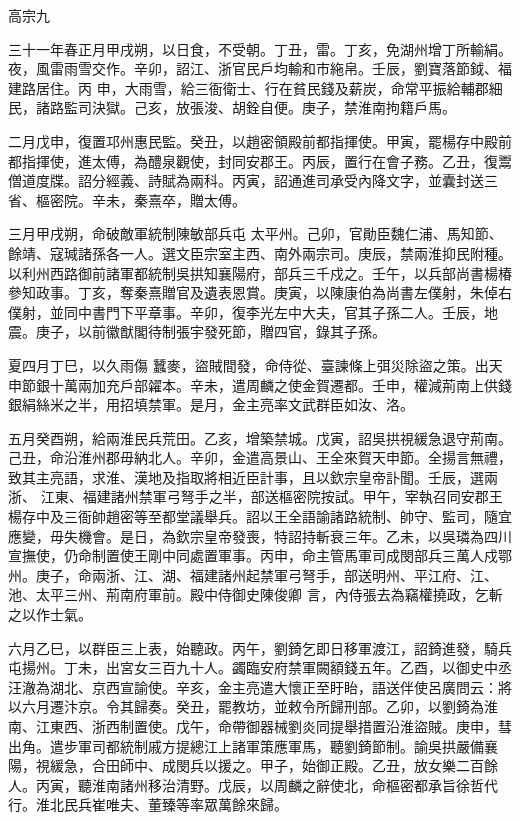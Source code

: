 
\begin{pinyinscope}

 高宗九



 三十一年春正月甲戌朔，以日食，不受朝。丁丑，雷。丁亥，免湖州增丁所輸絹。夜，風雷雨雪交作。辛卯，詔江、浙官民戶均輸和市絁帛。壬辰，劉寶落節鉞、福建路居住。丙
 申，大雨雪，給三衙衛士、行在貧民錢及薪炭，命常平振給輔郡細民，諸路監司決獄。己亥，放張浚、胡銓自便。庚子，禁淮南拘籍戶馬。



 二月戊申，復置邛州惠民監。癸丑，以趙密領殿前都指揮使。甲寅，罷楊存中殿前都指揮使，進太傅，為醴泉觀使，封同安郡王。丙辰，置行在會子務。乙丑，復鬻僧道度牒。詔分經義、詩賦為兩科。丙寅，詔通進司承受內降文字，並囊封送三省、樞密院。辛未，秦熹卒，贈太傅。



 三月甲戌朔，命破敵軍統制陳敏部兵屯
 太平州。己卯，官勛臣魏仁浦、馬知節、餘靖、寇瑊諸孫各一人。選文臣宗室主西、南外兩宗司。庚辰，禁兩淮抑民附種。以利州西路御前諸軍都統制吳拱知襄陽府，部兵三千戍之。壬午，以兵部尚書楊椿參知政事。丁亥，奪秦熹贈官及遺表恩賞。庚寅，以陳康伯為尚書左僕射，朱倬右僕射，並同中書門下平章事。辛卯，復李光左中大夫，官其子孫二人。壬辰，地震。庚子，以前徽猷閣待制張宇發死節，贈四官，錄其子孫。



 夏四月丁巳，以久雨傷
 蠶麥，盜賊間發，命侍從、臺諫條上弭災除盜之策。出天申節銀十萬兩加充戶部糴本。辛未，遣周麟之使金賀遷都。壬申，權減荊南上供錢銀絹絲米之半，用招填禁軍。是月，金主亮率文武群臣如汝、洛。



 五月癸酉朔，給兩淮民兵荒田。乙亥，增築禁城。戊寅，詔吳拱視緩急退守荊南。己丑，命沿淮州郡毋納北人。辛卯，金遣高景山、王全來賀天申節。全揚言無禮，致其主亮語，求淮、漢地及指取將相近臣計事，且以欽宗皇帝訃聞。壬辰，選兩浙、
 江東、福建諸州禁軍弓弩手之半，部送樞密院按試。甲午，宰執召同安郡王楊存中及三衙帥趙密等至都堂議舉兵。詔以王全語諭諸路統制、帥守、監司，隨宜應變，毋失機會。是日，為欽宗皇帝發喪，特詔持斬衰三年。乙未，以吳璘為四川宣撫使，仍命制置使王剛中同處置軍事。丙申，命主管馬軍司成閔部兵三萬人戍鄂州。庚子，命兩浙、江、湖、福建諸州起禁軍弓弩手，部送明州、平江府、江、池、太平三州、荊南府軍前。殿中侍御史陳俊卿
 言，內侍張去為竊權撓政，乞斬之以作士氣。



 六月乙巳，以群臣三上表，始聽政。丙午，劉錡乞即日移軍渡江，詔錡進發，騎兵屯揚州。丁未，出宮女三百九十人。蠲臨安府禁軍闕額錢五年。乙酉，以御史中丞汪澈為湖北、京西宣諭使。辛亥，金主亮遣大懷正至盱眙，語送伴使呂廣問云：將以六月遷汴京。令其歸奏。癸丑，罷教坊，並敕令所歸刑部。乙卯，以劉錡為淮南、江東西、浙西制置使。戊午，命帶御器械劉炎同提舉措置沿淮盜賊。庚申，彗
 出角。遣步軍司都統制戚方提總江上諸軍策應軍馬，聽劉錡節制。諭吳拱嚴備襄陽，視緩急，合田師中、成閔兵以援之。甲子，始御正殿。乙丑，放女樂二百餘人。丙寅，聽淮南諸州移治清野。戊辰，以周麟之辭使北，命樞密都承旨徐哲代行。淮北民兵崔唯夫、董臻等率眾萬餘來歸。




\end{pinyinscope}
